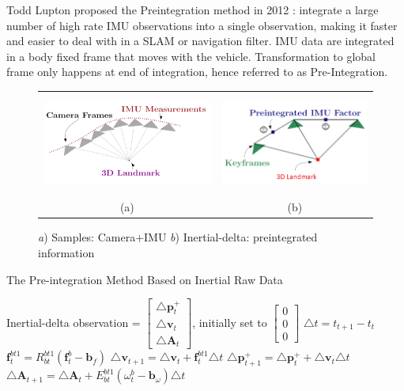 \documentclass[12pt]{article}   %
\begin{document}
Todd Lupton proposed the Preintegration method in 2012 \cite{Lupton2012}: integrate a large number of high rate IMU observations into a single observation, making it faster and easier to deal with in a SLAM or navigation filter. IMU data are integrated in a body fixed frame that moves with the vehicle. Transformation to global frame only happens at end of integration, hence referred to as Pre-Integration. 
\begin{figure}[!ht]
	\begin{center}\begin{tabular}{cc}
			\includegraphics[height=3.3cm]{figures/IMU-sample_Image-frames_3D_illustration.png}&
			\includegraphics[height=3.3cm]{Figures/Preintegrated-IMU_image_3D_illustration.png}\\
			(a) & (b) \\
		\end{tabular}\end{center}
		\caption{\emph{a}) Samples: Camera+IMU \emph{b}) Inertial-delta: preintegrated information \cite{Manifold2015}} 
		\label{fig:VIN sensor information}
	\end{figure} 

\begin{algorithm}
	\caption{The Pre-integration Method Based on Inertial Raw Data}
	\label{algm:preint}		
	\begin{algorithmic}
	\STATE Inertial-delta observation = $\begin{bmatrix} \triangle \textbf{p}_{t}^+ \\ \triangle \textbf{v}_{t} \\ \triangle \textbf{A} _{t} \end{bmatrix}$, initially set to $\begin{bmatrix} 0 \\ 0 \\ 0 \end{bmatrix}$
		\STATE $\triangle t =  t_{t+1} - t_t$ 
		\STATE $\textbf{f}_t^{bt1} = R_{bt}^{bt1} (\textbf{f}_t^b - \textbf{b}_f)$ 
		\STATE $\triangle \textbf{v}_{t+1} = \triangle \textbf{v}_{t} + \textbf{f}_t^{bt1} \triangle t$ 
		\STATE $\triangle \textbf{p}_{t+1}^+ = \triangle \textbf{p}_{t}^+ + \triangle \textbf{v}_t \triangle t$ 
		\STATE $\triangle \textbf{A} _{t+1} = \triangle \textbf{A} _{t} + E_{bt}^{bt1} (\omega _t^b - \textbf{b}_\omega) \triangle t$ 
		\ENDFOR
	\end{algorithmic}
\end{algorithm}
\end{document}
